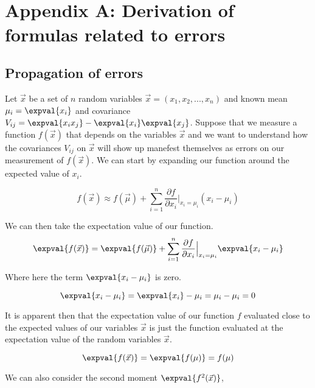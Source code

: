 \section*{\\Appendix A: Derivation of formulas related to errors}

\subsection*{Propagation of errors}

Let $\vec{x}$ be a set of $n$ random variables $\vec{x} = (x_1, x_2, ..., x_n)$ and known mean $\mu_i = \expval{x_i}$ and covariance $V_{ij} = \expval{x_i x_j}-\expval{x_i}\expval{x_j}$.  Suppose that we measure a function $f(\vec{x})$ that depends on the variables $\vec{x}$ and we want to understand how the covariances $V_{ij}$ on $\vec{x}$ will show up manefest themselves as errors on our measurement of $f(\vec{x})$.  We can start by expanding our function around the expected value of $x_i$.

\begin{equation}
        f(\vec{x}) \approx f(\vec{\mu}) + \sum_{i=1}^{n} \frac{\partial f}{\partial x_i} \Bigr|_{x_i = \mu_i} (x_i - \mu_i)
\end{equation}

We can then take the expectation value of our function.
\begin{equation}
        \expval{f(\vec{x})} = \expval{f(\vec{\mu})} + \sum_{i=1}^{n} \frac{\partial f}{\partial x_i} \Bigr|_{x_i = \mu_i} \expval{x_i - \mu_i}
\end{equation}

Where here the term $ \expval{x_i - \mu_i}$ is zero.

\begin{equation}
        \expval{x_i - \mu_i} = \expval{x_i} - \mu_i = \mu_i - \mu_i = 0
\end{equation}

It is apparent then that the expectation value of our function $f$ evaluated close to the expected values of our variables $\vec{x}$ is just the function evaluated at the expectation value of the random variables $\vec{x}$.

\begin{equation}
        \expval{f(\vec{x})} = \expval{f(\mu)} = f(\mu)
\end{equation}

We can also consider the second moment $\expval{f^2(\vec{x})}$,  

